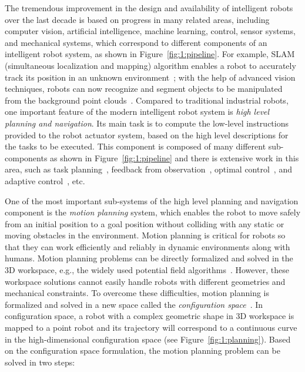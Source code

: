 The tremendous improvement in the design and availability of intelligent robots over the last decade is based on progress in many related areas, including computer vision, artificial intelligence, machine learning, control, sensor systems, and mechanical systems, which correspond to different components of an intelligent robot system, as shown in Figure~\ref{fig:1:pipeline}. For example, SLAM (simultaneous localization and mapping) algorithm enables a robot to accurately track its position in an unknown environment~\cite{PR:2005}; with the help of advanced vision techniques, robots can now recognize and segment objects to be manipulated from the background point clouds~\cite{Rusu:2009:IROS}. Compared to traditional industrial robots, one important feature of the modern intelligent robot system is \emph{high level planning and navigation}. Its main task is to compute the low-level instructions provided to the robot actuator system, based on the high level descriptions for the tasks to be executed. This component is composed of many different sub-components as shown in Figure~\ref{fig:1:pipeline} and there is extensive work in this area, such as task planning~\cite{LPT:TPP:1989}, feedback from observation~\cite{KLP:2012:UPE,KLP:2011:NOW}, optimal control~\cite{Stengel:1994:OC}, and adaptive control~\cite{Astrom:1994:AC}, etc.


One of the most important sub-systems of the high level planning and navigation component is the \emph{motion planning} system, which enables the robot to move safely from an initial position to a goal position without colliding with any static or moving obstacles in the environment. Motion planning is critical for robots so that they can work efficiently and reliably in dynamic environments along with humans. Motion planning problems can be directly formalized and solved in the 3D workspace, e.g., the widely used potential field algorithms~\cite{Khatib:IJRR:1986}. However, these workspace solutions cannot easily handle robots with different geometries and mechanical constraints. To overcome these difficulties, 
motion planning is formalized and solved in a new space called the \emph{configuration space}~\cite{Lozano-Perez:1979:APC,LPT:APM:1981,LPT:SpatialPlanning:1983}. In configuration space, a robot with a complex geometric shape in 3D workspace is mapped to a point robot and its trajectory will correspond to a continuous curve in the high-dimensional configuration space (see Figure~\ref{fig:1:planning}). Based on the configuration space formulation, the motion planning problem can be solved in two steps:

